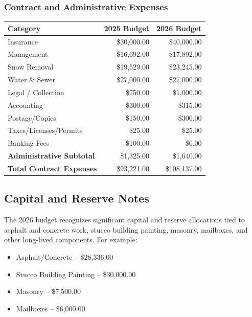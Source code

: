 \documentclass[11pt]{article}
\newcommand{\strong}[1]{\textbf{#1}}
\newcommand{\money}[1]{\$#1}
\begin{document}
\subsubsection*{Contract and Administrative Expenses}
\vspace{-0.6em}

\begin{center}
\begin{tabular}{@{}lrr@{}}
\toprule
\textbf{Category} & \textbf{2025 Budget} & \textbf{2026 Budget} \\
\midrule
Insurance & \money{30{,}000.00} & \money{40{,}000.00} \\
Management & \money{16{,}692.00} & \money{17{,}892.00} \\
Snow Removal & \money{19{,}529.00} & \money{23{,}245.00} \\
Water \& Sewer & \money{27{,}000.00} & \money{27{,}000.00} \\
Legal / Collection & \money{750.00} & \money{1{,}000.00} \\
Accounting & \money{300.00} & \money{315.00} \\
Postage/Copies & \money{150.00} & \money{300.00} \\
Taxes/Licenses/Permits & \money{25.00} & \money{25.00} \\
Banking Fees & \money{100.00} & \money{0.00} \\
\midrule
\strong{Administrative Subtotal} & \money{1{,}325.00} & \money{1{,}640.00} \\
\midrule
\strong{Total Contract Expenses} & \money{93{,}221.00} & \money{108{,}137.00} \\
\bottomrule
\end{tabular}
\end{center}

\subsection{Capital and Reserve Notes}

\noindent
The 2026 budget recognizes significant capital and reserve allocations tied to asphalt and
concrete work, stucco building painting, masonry, mailboxes, and other long-lived
components. For example:
\begin{itemize}[leftmargin=1.1em]
    \item Asphalt/Concrete -- \money{28{,}336.00}
    \item Stucco Building Painting -- \money{30{,}000.00}
    \item Masonry -- \money{7{,}500.00}
    \item Mailboxes -- \money{6{,}000.00}
\end{itemize}
\end{document}
